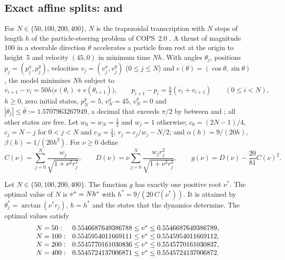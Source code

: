 \subsection{Exact affine splits:  and }\label{sec:split-affine}

For $N\in\{50,100,200,400\}$, $N$ is the trapezoidal transcription with $N$ steps of length $h$ of the particle-steering problem of COPS~2.0 \citep{dolan2001-benchmarking-optimization-software-with-cops}.
A thrust of magnitude 100 in a steerable direction $\theta$ accelerates a particle from rest at the origin to height~5 and velocity $(45,0)$ in minimum time $Nh$.
With angles $\theta_j$, positions $p_j=(p^x_j,p^y_j)$, velocities $v_j=(v^x_j,v^y_j)$ ($0\le j\le N$) and $e(\theta)=(\cos\theta,\sin\theta)$, the model minimizes $Nh$ subject to
\[
  v_{i+1}-v_i=50h\bigl(e(\theta_i)+e(\theta_{i+1})\bigr),\qquad p_{i+1}-p_i=\tfrac h2(v_i+v_{i+1})\qquad(0\le i<N),
\]
$h\ge0$, zero initial states, $p^y_N=5$, $v^x_N=45$, $v^y_N=0$ and $|\theta_j|\le\bar\theta:=1.5707963267949$, a decimal that exceeds $\pi/2$ by between  and ; all other states are free.
Let $w_0=w_N=\frac12$ and $w_j=1$ otherwise; $c_0=(2N-1)/4$, $c_j=N-j$ for $0<j<N$ and $c_N=\frac14$; $r_j=c_j/w_j-N/2$; and $\alpha(h)=9/(20h)$, $\beta(h)=1/(20h^2)$.
For $\nu\ge0$ define
\begin{equation}\label{eq:lnts-g}
  C(\nu)=\sum_{j=0}^N\frac{w_j}{\sqrt{1+\nu^2r_j^2}},\qquad
  D(\nu)=\nu\sum_{j=0}^N\frac{w_jr_j^2}{\sqrt{1+\nu^2r_j^2}},\qquad
  g(\nu)=D(\nu)-\frac{20}{81}C(\nu)^2.
\end{equation}

\begin{theorem}\label{thm:lnts-opt}
Let $N\in\{50,100,200,400\}$.
The function $g$ has exactly one positive root $\nu^*$.
The optimal value of $N$ is $v^{*}=Nh^*$ with $h^*=9/(20\,C(\nu^*))$.
It is attained by $\theta^*_j=\arctan(\nu^*r_j)$, $h=h^*$ and the states that the dynamics determine.
The optimal values satisfy
\[
\begin{array}{ll}
  N=50: & 0.5546687649386788\le v^{*}\le0.5546687649386789,\\
  N=100: & 0.5545954011669111\le v^{*}\le0.5545954011669112,\\
  N=200: & 0.5545770161030836\le v^{*}\le0.5545770161030837,\\
  N=400: & 0.5545724137006871\le v^{*}\le0.5545724137006872.
\end{array}
\]
\end{theorem}

